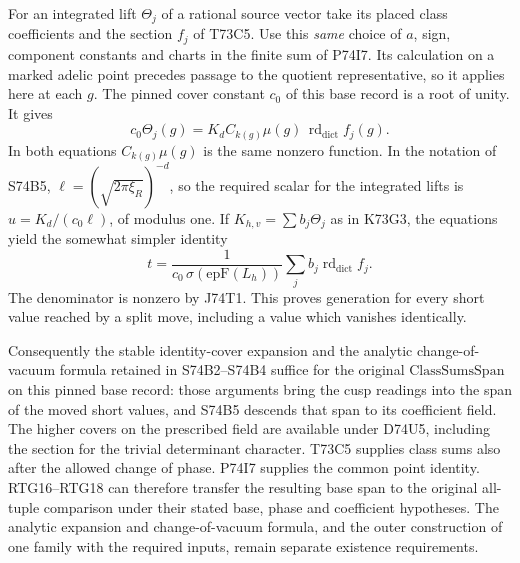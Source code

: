 For an integrated lift $\Theta_j$ of a rational source vector take
its placed class coefficients and the section $f_j$ of T73C5.
Use this \emph{same} choice of $a$, sign, component constants and
charts in the finite sum of P74I7. Its calculation on a marked
adelic point precedes passage to the quotient representative, so it
applies here at each $g$. The pinned cover constant $c_0$ of this
base record is a root of unity. It gives
\[
 c_0\Theta_j(g)=K_d C_{k(g)}\mu(g)\,
                         \operatorname{rd}_{\mathrm{dict}} f_j(g).
\]
In both equations $C_{k(g)}\mu(g)$ is the same nonzero function.
In the notation of S74B5, $\ell=(\sqrt{2\pi\xi_R})^{-d}$,
so the required scalar for the integrated lifts is
$u=K_d/(c_0\ell)$, of modulus one. If
$K_{h,v}=\sum b_j\Theta_j$ as in K73G3, the equations yield the
somewhat simpler identity
\[
       t=\frac{1}{c_0\,\sigma(\mathrm{epF}(L_h))}
                 \sum_j b_j\operatorname{rd}_{\mathrm{dict}} f_j .
\]
The denominator is nonzero by J74T1. This proves generation for
every short value reached by a split move, including a value which
vanishes identically.

Consequently the stable identity-cover expansion and the analytic
change-of-vacuum formula retained in S74B2--S74B4 suffice for the
original $\mathrm{ClassSumsSpan}$ on this pinned base record: those
arguments bring the cusp readings into the span of the moved short
values, and S74B5 descends that span to its coefficient field.
The higher covers on the prescribed field are available under D74U5,
including the section for the trivial determinant character. T73C5
supplies class sums also after the allowed change of phase.
P74I7 supplies the common point identity. RTG16--RTG18 can therefore
transfer the resulting base span to the original all-tuple comparison
under their stated base, phase and coefficient hypotheses. The
analytic expansion and change-of-vacuum formula, and the outer
construction of one family with the required inputs, remain separate
existence requirements.
